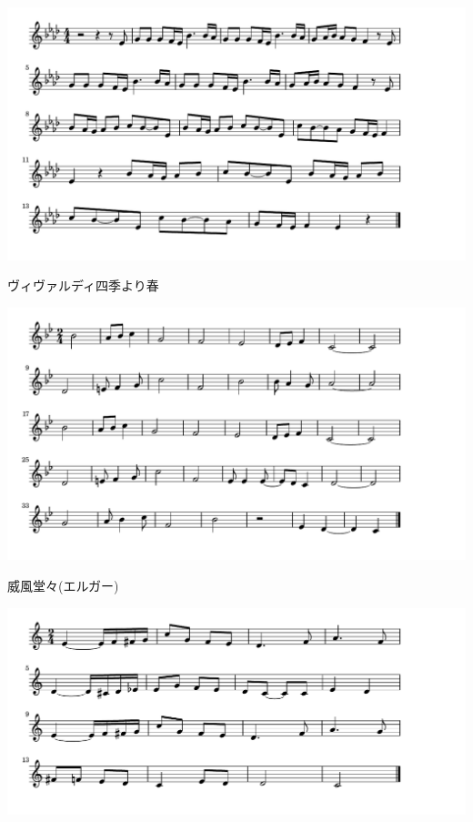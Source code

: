 \documentclass[a4paper]{ltjsarticle}
\begin{document}
\includegraphics[clip]{vivaldishiki_crop.pdf}

\vspace{-10mm} \hspace{10mm}
ヴィヴァルディ四季より春

\includegraphics[clip]{ifudodo_crop.pdf}

\vspace{-10mm} \hspace{10mm}
威風堂々(エルガー)

\includegraphics[clip]{mendelsharunouta_crop.pdf}
\end{document}
